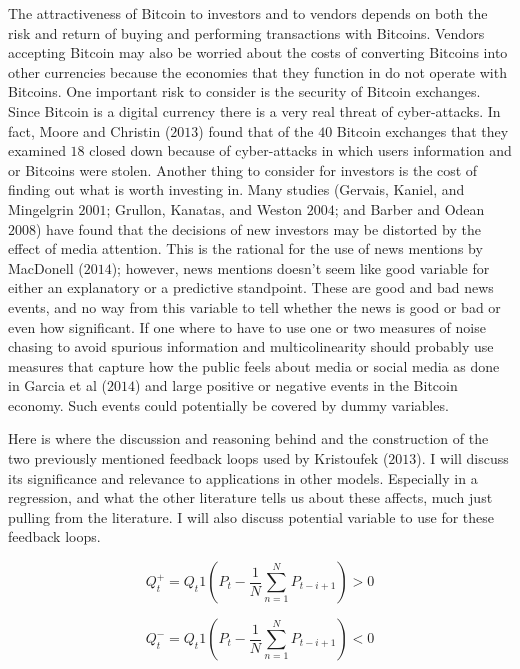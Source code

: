 \documentclass{article}[10 pt]
\newcommand{\vs}{\vspace{0.1in}}
\begin{document}
\vs

The attractiveness of Bitcoin to investors and to vendors depends on both
the risk and return of buying and performing transactions with Bitcoins.
Vendors accepting Bitcoin may also be worried about the costs of converting
Bitcoins into other currencies because the economies that they function in
do not operate with Bitcoins. One important risk to consider is the security
of Bitcoin exchanges. Since Bitcoin is a digital currency there is a very
real threat of cyber-attacks. In fact, Moore and Christin ($2013$) found
that of the $40$ Bitcoin exchanges that they examined $18$ closed down
because of cyber-attacks in which users information and or Bitcoins were
stolen. Another thing to consider for investors is the cost of finding out
what is worth investing in. Many studies (Gervais, Kaniel, and Mingelgrin
$2001$; Grullon, Kanatas, and Weston $2004$; and Barber and Odean $2008$)
have found that the decisions of new investors may be distorted by the
effect of media attention. This is the rational for the use of news mentions
by MacDonell ($2014$); however, news mentions doesn't seem like good variable
for either an explanatory or a predictive standpoint. These are good and bad
news events, and no way from this variable to tell whether the news is good or bad
or even how significant. If one where to have to use one or two measures 
of noise chasing to avoid spurious information and multicolinearity should
probably use measures that capture how the public feels about media or
social media as done in Garcia et al ($2014$) and large positive or negative 
events in the Bitcoin economy. Such events could potentially be covered
by dummy variables.

\vs

Here is where the discussion and reasoning behind and the construction of
the two previously mentioned
feedback loops used by Kristoufek ($2013$). I will discuss its significance
and relevance to applications in other models. Especially in a regression, and what the other
literature tells us about these affects, much just pulling from the
literature. I will also discuss potential variable to use for these feedback
loops.

\vs

\begin{center} $$Q_{t}^{+} =
    Q_{t}1(P_{t}-\dfrac{1}{N}\sum_{n=1}^{N}P_{t-i+1}) > 0$$ \end{center}

\vs

\begin{center} $$Q_{t}^{-} =
    Q_{t}1(P_{t}-\dfrac{1}{N}\sum_{n=1}^{N}P_{t-i+1}) < 0$$ \end{center}
\end{document}

